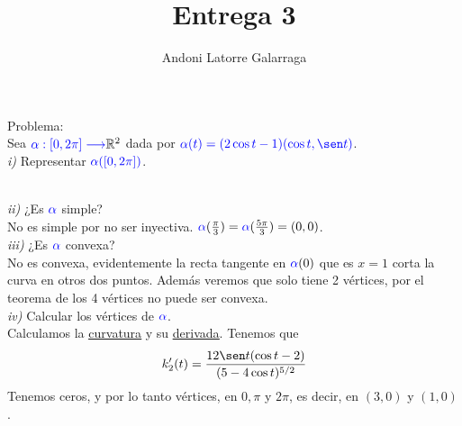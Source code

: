 \documentclass{article}
\title{Entrega 3}
\author{Andoni Latorre Galarraga}
\date{}
\newcommand{\bb}[1]{\mathbb{#1}}
\begin{document}
\maketitle

\textcolor{WildStrawberry}{Problema:}\\
Sea $\textcolor{blue}{\alpha:[0,2\pi] \longrightarrow} \bb{R}^2$ dada por $\textcolor{blue}{\alpha(t)= (2\cos t -1)(\cos t, \sen t)}$.\\
\textit{i)} Representar $\textcolor{blue}{\alpha([0, 2\pi])}$.\\
\\
\textit{ii)} ¿Es $\textcolor{blue}{\alpha}$ simple?\\
No es simple por no ser inyectiva. $\textcolor{blue}{\alpha}(\frac{\pi}{3})=\textcolor{blue}{\alpha}(\frac{5\pi}{3})=(0,0)$.\\
\textit{iii)} ¿Es $\textcolor{blue}{\alpha}$ convexa?\\
No es convexa, evidentemente la recta tangente en $\textcolor{blue}{\alpha}(0)$ que es $x= 1$ corta la curva en otros dos puntos. Además veremos que solo tiene 2 vértices, por el teorema de los 4 vértices no puede ser convexa.\\
\textit{iv)} Calcular los vértices de $\textcolor{blue}{\alpha}$.\\
Calculamos la \href{https://www.wolframalpha.com/input?i=Curvature+of+%28%282cos%28t%29-1%29*cos%28t%29%2C%282cos%28t%29-1%29*sin%28t%29%29}{\textcolor{WildStrawberry}{\underline{curvatura}}} y su \href{https://www.wolframalpha.com/input?i=derivative+%289+-+6+cos%28t%29%29%2F%285+-+4+cos%28t%29%29%5E%283%2F2%29}{\textcolor{WildStrawberry}{\underline{derivada}}}. Tenemos que
$$
k_2'(t)=\frac{12 \sen t(\cos t -2)}{(5- 4 \cos t)^{5/2}}
$$
Tenemos ceros, y por lo tanto vértices, en $0, \pi$ y $2\pi$, es decir, en $(3,0)$ y $(1,0)$.
\end{document}
